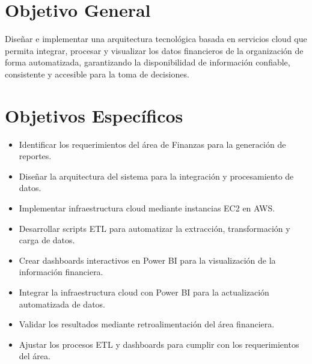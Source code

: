 \section{Objetivo General}

Diseñar e implementar una arquitectura tecnológica basada en servicios cloud que permita integrar, procesar y visualizar los datos financieros de la organización de forma automatizada, garantizando la disponibilidad de información confiable, consistente y accesible para la toma de decisiones.

\section{Objetivos Específicos}

\begin{itemize}
    \item Identificar los requerimientos del área de Finanzas para la generación de reportes.  
    \item Diseñar la arquitectura del sistema para la integración y procesamiento de datos.  
    \item Implementar infraestructura cloud mediante instancias EC2 en AWS.  
    \item Desarrollar scripts ETL para automatizar la extracción, transformación y carga de datos.  
    \item Crear dashboards interactivos en Power BI para la visualización de la información financiera.  
    \item Integrar la infraestructura cloud con Power BI para la actualización automatizada de datos.  
    \item Validar los resultados mediante retroalimentación del área financiera.  
    \item Ajustar los procesos ETL y dashboards para cumplir con los requerimientos del área.
\end{itemize}
